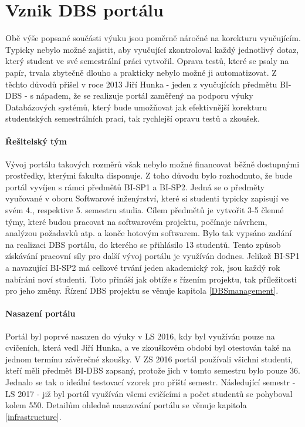 \section{Vznik DBS portálu} \label{DBSportal:creation}
Obě výše popsané součásti výuku jsou poměrně náročné na korekturu vyučujícím. Typicky nebylo možné zajistit, aby vyučující zkontroloval každý jednotlivý dotaz, který student ve své semestrální práci vytvořil. Oprava testů, které se psaly na papír, trvala zbytečně dlouho a prakticky nebylo možné ji automatizovat. Z těchto důvodů přišel v roce 2013 Jiří Hunka - jeden z vyučujících předmětu BI-DBS - s nápadem, že se realizuje portál zaměřený na podporu výuky Databázových systémů, který bude umožňovat jak efektivnější korekturu studentských semestrálních prací, tak rychlejší opravu testů a zkoušek.

\paragraph{Řešitelský tým}
Vývoj portálu takových rozměrů však nebylo možné financovat běžně dostupnými prostředky, kterými fakulta disponuje. Z toho důvodu bylo rozhodnuto, že bude portál vyvíjen s rámci předmětů BI-SP1 a BI-SP2. Jedná se o předměty vyučované v oboru Softwarové inženýrství, které si studenti typicky zapisují ve svém 4., respektive 5. semestru studia. Cílem předmětů je vytvořit 3-5 členné týmy, které budou pracovat na softwarovém projektu, počínaje návrhem, analýzou požadavků atp. a konče hotovým softwarem. Bylo tak vypsáno zadání na realizaci DBS portálu, do kterého se přihlásilo 13 studentů.
Tento způsob získávání pracovní síly pro další vývoj portálu je využíván dodnes. Jelikož BI-SP1 a navazující BI-SP2 má celkové trvání jeden akademický rok, jsou každý rok nabíráni noví studenti. Toto přináší jak obtíže s řízením projektu, tak příležitosti pro jeho změny. Řízení DBS projektu se věnuje kapitola \ref{DBSmanagement}.

\paragraph{Nasazení portálu}
Portál byl poprvé nasazen do výuky v LS 2016, kdy byl využíván pouze na cvičeních, která vedl Jiří Hunka, a ve zkouškovém období byl otestován také na jednom termínu závěrečné zkoušky.
V ZS 2016 portál používali všichni studenti, kteří měli předmět BI-DBS zapsaný, protože jich v tomto semestru bylo pouze 36. Jednalo se tak o ideální testovací vzorek pro příští semestr. Následující semestr - LS 2017 - již byl portál využíván všemi cvičícími a počet studentů se pohyboval kolem 550. Detailům ohledně nasazování portálu se věnuje kapitola \ref{infrastructure}.

